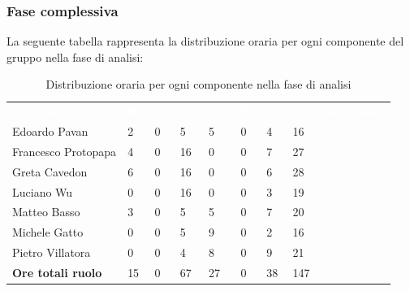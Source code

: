 \subsubsection{Fase complessiva}
La seguente tabella rappresenta la distribuzione oraria per ogni componente del gruppo nella fase di analisi:
\begin{table}[H]
\begin{center}
\renewcommand{\arraystretch}{1.25}
\begin{tabular}{ m{}<{\centering}  m{}<{\centering} m{}<{\centering} m{}<{\centering}  m{}<{\centering}  m{}<{\centering}  m{}<{\centering}  m{}<{\centering}   }
	\rowcolor{darkblue}
	\textcolor{white}{\textbf{Componente}} &\textcolor{white}{\textbf{Re}}&\textcolor{white}{\textbf{Pt}}&\textcolor{white}{\textbf{An}}&\textcolor{white}{\textbf{Am}}&\textcolor{white}{\textbf{Pr}}&\textcolor{white}{\textbf{Ve}}&\textcolor{white}{\textbf{Ore complessive}}\\ 
	Edoardo Pavan & 2 & 0 & 5 & 5 & 0 & 4 & 16 \\	
	
	Francesco Protopapa & 4 & 0 & 16 & 0 & 0 & 7 & 27 \\

	Greta Cavedon & 6 & 0 & 16 & 0 & 0 & 6 & 28 \\
	
	Luciano Wu & 0 & 0 & 16 & 0 & 0 & 3 & 19 \\
	
	Matteo Basso & 3 & 0 & 5 & 5 & 0 & 7 & 20 \\
	
	Michele Gatto &  0 & 0 & 5 & 9 & 0 & 2 & 16 \\
	
	Pietro Villatora & 0 & 0 & 4 & 8 & 0 & 9 & 21 \\
	
	\textbf{Ore totali ruolo} & 15 & 0 & 67 & 27 & 0 & 38 & 147\\

\end{tabular}
\caption{Distribuzione oraria per ogni componente nella fase di analisi}
\end{center}
\end{table}

